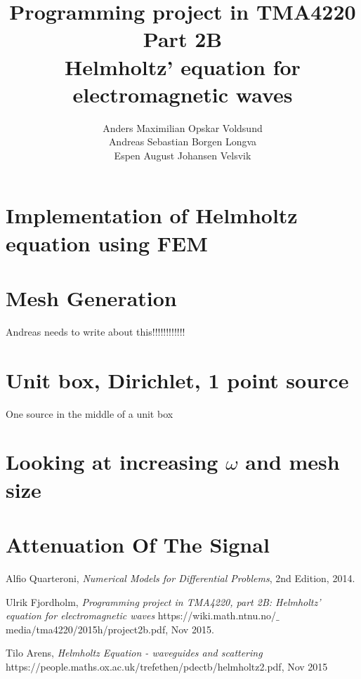 \documentclass[10pt,a4paper]{article}
\begin{document}
\title{Programming project in TMA4220 \\ Part 2B \\ Helmholtz' equation for electromagnetic waves}
\author{Anders Maximilian Opskar Voldsund \\ Andreas Sebastian Borgen Longva \\ Espen August Johansen Velsvik}
\maketitle











\section*{Implementation of Helmholtz equation using FEM}


\section*{Mesh Generation}
Andreas needs to write about this!!!!!!!!!!!!

\section*{Unit box, Dirichlet, 1 point source}
One source in the middle of a unit box



\section*{Looking at increasing $\omega$ and mesh size}



\section*{Attenuation Of The Signal}










\begin{thebibliography}{}

Alfio Quarteroni, \emph{Numerical Models for Differential Problems}, 2nd Edition, 2014.

Ulrik Fjordholm, \emph{Programming project in TMA4220, part 2B:
Helmholtz' equation for electromagnetic waves} https://wiki.math.ntnu.no/$\_$media/tma4220/2015h/project2b.pdf, Nov 2015.

Tilo Arens, \emph{Helmholtz Equation - waveguides and scattering} https://people.maths.ox.ac.uk/trefethen/pdectb/helmholtz2.pdf, Nov 2015


\end{thebibliography}
\end{document}
